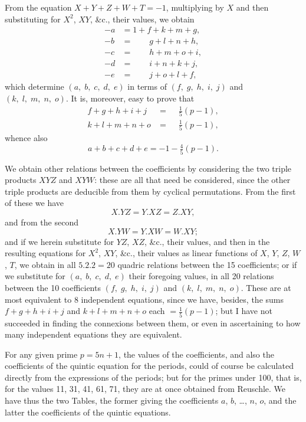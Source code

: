 \documentclass[11pt,a4paper]{book}
\begin{document}
From the equation $X + Y + Z + W + T = -1$, multiplying by $X$ and then substituting for $X^2$, $XY$, \&c., their values, we obtain
\begin{align*}
-a &= 1 + f + k + m + g, \\
-b &= \phantom{1 +}\; g + l + n + h, \\
-c &= \phantom{1 +}\; h + m + o + i, \\
-d &= \phantom{1 +}\; i + n + k + j, \\
-e &= \phantom{1 +}\; j + o + l + f,
\end{align*}
which determine $(a,\; b,\; c,\; d,\; e)$ in terms of $(f,\; g,\; h,\; i,\; j)$ and $(k,\; l,\; m,\; n,\; o)$. It is, moreover, easy to prove that
\begin{align*}
f + g + h + i + j &= \phantom{-}\tfrac{1}{5}(p - 1), \\
k + l + m + n + o &= \phantom{-}\tfrac{1}{5}(p - 1),
\end{align*}
whence also
\[
a + b + c + d + e = -1 - \tfrac{4}{5}(p - 1).
\]

We obtain other relations between the coefficients by considering the two triple products $XYZ$ and $XYW$: these are all that need be considered, since the other triple products are deducible from them by cyclical permutations. From the first of these we have
\[
X.YZ = Y.XZ = Z.XY,
\]
and from the second
\[
X.YW = Y.XW = W.XY;
\]
and if we herein substitute for $YZ$, $XZ$, \&c., their values, and then in the resulting equations for $X^2$, $XY$, \&c., their values as linear functions of $X$, $Y$, $Z$, $W$, $T$, we obtain in all $5.2.2 = 20$ quadric relations between the 15 coefficients; or if we substitute for $(a,\; b,\; c,\; d,\; e)$ their foregoing values, in all 20 relations between the 10 coefficients $(f,\; g,\; h,\; i,\; j)$ and $(k,\; l,\; m,\; n,\; o)$. These are at most equivalent to 8 independent equations, since we have, besides, the sums $f + g + h + i + j$ and $k + l + m + n + o$ each $= \tfrac{1}{5}(p - 1)$; but I have not succeeded in finding the connexions between them, or even in ascertaining to how many independent equations they are equivalent.

For any given prime $p = 5n + 1$, the values of the coefficients, and also the coefficients of the quintic equation for the periods, could of course be calculated directly from the expressions of the periods; but for the primes under 100, that is, for the values 11, 31, 41, 61, 71, they are at once obtained from Reuschle. We have thus the two Tables, the former giving the coefficients $a$, $b$, \ldots, $n$, $o$, and the latter the coefficients of the quintic equations.
\end{document}
